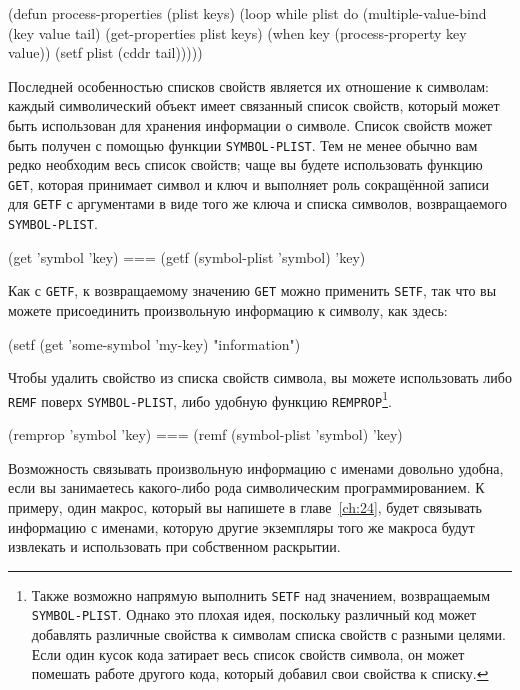 \begin{myverb}
(defun process-properties (plist keys)
  (loop while plist do
	(multiple-value-bind (key value tail) (get-properties plist keys)
	  (when key (process-property key value))
	  (setf plist (cddr tail)))))
\end{myverb}

Последней особенностью списков свойств является их отношение к символам: каждый
символический объект имеет связанный список свойств, который может быть использован для
хранения информации о символе. Список свойств может быть получен с помощью функции
\lstinline{SYMBOL-PLIST}. Тем не менее обычно вам редко необходим весь список свойств; чаще вы
будете использовать функцию \lstinline{GET}, которая принимает символ и ключ и выполняет роль
сокращённой записи для \lstinline{GETF} с аргументами в виде того же ключа и списка символов,
возвращаемого \lstinline{SYMBOL-PLIST}.

\begin{myverb}
  (get 'symbol 'key) === (getf (symbol-plist 'symbol) 'key)
\end{myverb}

Как с \lstinline{GETF}, к возвращаемому значению \lstinline{GET} можно применить \lstinline{SETF}, так
что вы можете присоединить произвольную информацию к символу, как здесь:

\begin{myverb}
  (setf (get 'some-symbol 'my-key) "information")
\end{myverb}

Чтобы удалить свойство из списка свойств символа, вы можете использовать либо \lstinline{REMF}
поверх \lstinline{SYMBOL-PLIST}, либо удобную функцию \lstinline{REMPROP}\footnote{Также возможно
  напрямую выполнить \lstinline{SETF} над значением, возвращаемым \lstinline{SYMBOL-PLIST}. Однако
  это плохая идея, поскольку различный код может добавлять различные свойства к символам
  списка свойств с разными целями. Если один кусок кода затирает весь список свойств
  символа, он может помешать работе другого кода, который добавил свои свойства к списку.}.

\begin{myverb}
  (remprop 'symbol 'key) === (remf (symbol-plist 'symbol) 'key)
\end{myverb}

Возможность связывать произвольную информацию с именами довольно удобна, если вы
занимаетесь какого-либо рода символическим программированием. К примеру, один макрос,
который вы напишете в главе~\ref{ch:24}, будет связывать информацию с именами, которую
другие экземпляры того же макроса будут извлекать и использовать при собственном
раскрытии.

